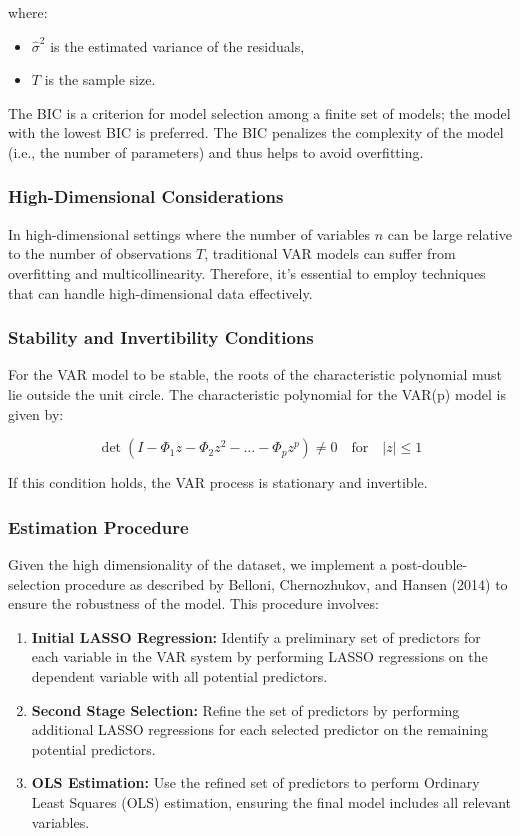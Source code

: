 \documentclass[12pt]{article}
\begin{document}
where:
\begin{itemize}
    \item \(\hat{\sigma}^2\) is the estimated variance of the residuals,
    \item \(T\) is the sample size.
\end{itemize}

The BIC is a criterion for model selection among a finite set of models; the model with the lowest BIC is preferred. The BIC penalizes the complexity of the model (i.e., the number of parameters) and thus helps to avoid overfitting.

\subsubsection{High-Dimensional Considerations}

In high-dimensional settings where the number of variables \(n\) can be large relative to the number of observations \(T\), traditional VAR models can suffer from overfitting and multicollinearity. Therefore, it's essential to employ techniques that can handle high-dimensional data effectively.

\subsubsection{Stability and Invertibility Conditions}

For the VAR model to be stable, the roots of the characteristic polynomial must lie outside the unit circle. The characteristic polynomial for the VAR(p) model is given by:

\[
\det(I - \Phi_1 z - \Phi_2 z^2 - \ldots - \Phi_p z^p) \neq 0 \quad \text{for} \quad |z| \leq 1
\]

If this condition holds, the VAR process is stationary and invertible.

\subsubsection{Estimation Procedure}

Given the high dimensionality of the dataset, we implement a post-double-selection procedure as described by Belloni, Chernozhukov, and Hansen (2014) to ensure the robustness of the model. This procedure involves:

\begin{enumerate}
    \item \textbf{Initial LASSO Regression:} Identify a preliminary set of predictors for each variable in the VAR system by performing LASSO regressions on the dependent variable with all potential predictors.
    \item \textbf{Second Stage Selection:} Refine the set of predictors by performing additional LASSO regressions for each selected predictor on the remaining potential predictors.
    \item \textbf{OLS Estimation:} Use the refined set of predictors to perform Ordinary Least Squares (OLS) estimation, ensuring the final model includes all relevant variables.
\end{enumerate}
\end{document}
